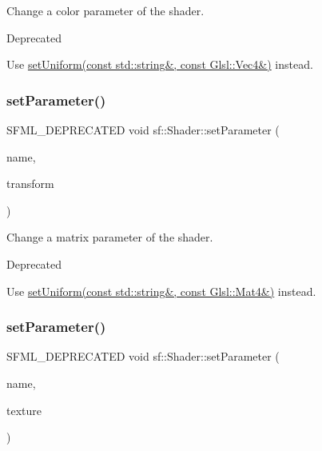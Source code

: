 Change a color parameter of the shader. 

\begin{DoxyRefDesc}{Deprecated}
\item[\hyperlink{deprecated__deprecated000013}{Deprecated}]Use \hyperlink{classsf_1_1_shader_abc1aee8343800680fd62e1f3d43c24bf}{set\+Uniform(const std\+::string\&, const Glsl\+::\+Vec4\&)} instead.\end{DoxyRefDesc}
\mbox{\label{classsf_1_1_shader_a398a802fc5295ab69b0317892b0f0c75}} 
\subsubsection{\texorpdfstring{set\+Parameter()}{setParameter()}\hspace{0.1cm}{\footnotesize\ttfamily [8/10]}}
{\footnotesize\ttfamily S\+F\+M\+L\+\_\+\+D\+E\+P\+R\+E\+C\+A\+T\+ED void sf\+::\+Shader\+::set\+Parameter (\begin{DoxyParamCaption}\item[{const std\+::string \&}]{name,  }\item[{const \hyperlink{classsf_1_1_transform}{Transform} \&}]{transform }\end{DoxyParamCaption})}



Change a matrix parameter of the shader. 

\begin{DoxyRefDesc}{Deprecated}
\item[\hyperlink{deprecated__deprecated000014}{Deprecated}]Use \hyperlink{classsf_1_1_shader_aca5c55c4a3b23d21e33dbdaab7990755}{set\+Uniform(const std\+::string\&, const Glsl\+::\+Mat4\&)} instead.\end{DoxyRefDesc}
\mbox{\label{classsf_1_1_shader_a08c7cafd4f73ab898319c4fd7d8b5501}} 
\subsubsection{\texorpdfstring{set\+Parameter()}{setParameter()}\hspace{0.1cm}{\footnotesize\ttfamily [9/10]}}
{\footnotesize\ttfamily S\+F\+M\+L\+\_\+\+D\+E\+P\+R\+E\+C\+A\+T\+ED void sf\+::\+Shader\+::set\+Parameter (\begin{DoxyParamCaption}\item[{const std\+::string \&}]{name,  }\item[{const \hyperlink{classsf_1_1_texture}{Texture} \&}]{texture }\end{DoxyParamCaption})}



